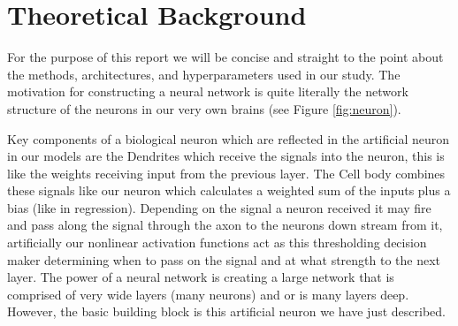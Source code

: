 \documentclass[11pt]{amsart}
\begin{document}
\section{Theoretical Background}\label{sec:theory}
For the purpose of this report we will be concise and straight to the point about the methods, architectures, and hyperparameters used in our study.
The motivation for constructing a neural network is quite literally the network structure of the neurons in our very own brains (see Figure \ref{fig:neuron}).


Key components of a biological neuron which are reflected in the artificial neuron in our models are the Dendrites which receive the signals into the neuron, this is like the weights receiving input from the previous layer.
The Cell body combines these signals like our neuron which calculates a weighted sum of the inputs plus a bias (like in regression).
Depending on the signal a neuron received it may fire and pass along the signal through the axon to the neurons down stream from it, artificially our nonlinear activation functions act as this thresholding decision maker determining when to pass on the signal and at what strength to the next layer.
The power of a neural network is creating a large network that is comprised of very wide layers (many neurons) and or is many layers deep.
However, the basic building block is this artificial neuron we have just described.
\end{document}
